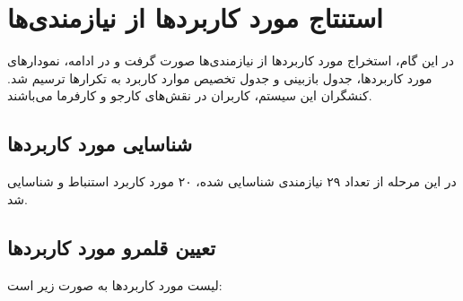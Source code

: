 \documentclass[12pt,svgnames,oneside]{book}
\begin{document}
	\chapter{استنتاج مورد کاربرد‌ها از نیازمندی‌‌ها}
		در این گام، استخراج مورد کاربرد‌ها از نیازمندی‌ها صورت گرفت و در ادامه، نمودار‌‌های مورد کاربرد‌ها، جدول بازبینی و جدول تخصیص موارد کاربرد به تکرار‌‌ها ترسیم شد. کنشگران این سیستم، کاربران در نقش‌های کارجو و کارفرما می‌باشند.
		
		\section{شناسایی مورد کاربرد‌ها}
			در این مرحله از تعداد ۲۹ نیازمندی شناسایی شده، ۲۰ مورد کاربرد استنباط و شناسایی شد.
		\section{تعیین قلمرو مورد کاربرد‌ها}
			لیست مورد کاربرد‌ها به صورت زیر است:
\end{document}
